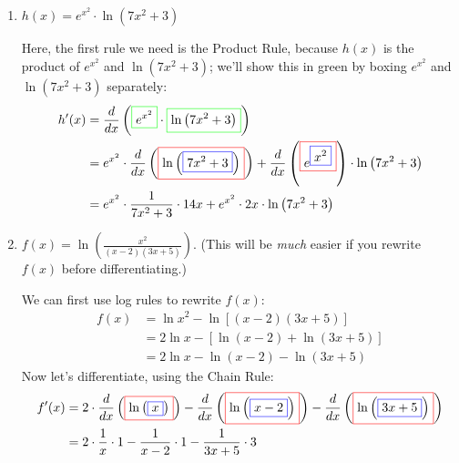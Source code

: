 \documentclass{article}
\begin{document}
\begin{enumerate}
\begin{enumerate}
  \item
    \begin{problem}[\vfill]
      $h(x) = e^{x^2} \cdot \ln (7x^2 + 3)$
    \end{problem}

    \begin{solution}
      Here, the first rule we need is the Product Rule, because $h(x)$ is
      the product of $e^{x^2}$ and $\ln(7x^2 + 3)$; we'll show this in
      green by boxing $e^{x^2}$ and $\ln(7x^2 + 3)$ separately:
      \begin{align*}
        h'(x) = {} & \frac{d}{dx} \left(\fcolorbox{green}{white}{$\displaystyle  e^ { x^ { 2} } $}\cdot \fcolorbox{green}{white}{$\displaystyle  \ln\left(7 x^ { 2} + 3\right)$}\right) \\
        = {} & e^ { x^ { 2} } \cdot \frac{d}{dx} \left(\fcolorbox{red}{white}{$\displaystyle \ln\left(\fcolorbox{blue}{white}{$\displaystyle 7 x^ { 2} + 3$}\right)$}\right)+ \frac{d}{dx} \left(\fcolorbox{red}{white}{$\displaystyle e^ { \fcolorbox{blue}{white}{$\displaystyle x^ { 2} $}} $}\right)\cdot \ln\left(7 x^ { 2} + 3\right) \\
        = {} & e^ { x^ { 2} } \cdot \frac{1}{7 x^ { 2} + 3}\cdot 14 x+ e^
        { x^ { 2} } \cdot 2 x \cdot \ln\left(7 x^ { 2} + 3\right)
      \end{align*}
    \end{solution}

  \item

    \begin{problem}[\vfill\newpage]
      $\displaystyle f(x) = \ln\left( \frac{x^2}{(x-2)(3x+5)}
      \right)$.  (This will be \textit{much} easier if you rewrite $f(x)$
      {before} differentiating.)
    \end{problem}

    \begin{solution}
      We can first use log rules to rewrite $f(x)$:
      \begin{align*}
        f(x) &= \ln x^2 - \ln [(x - 2) (3x + 5)] \\
        &= 2 \ln x - \left[ \ln(x - 2) + \ln (3x + 5)
        \right] \\
        &= 2 \ln x - \ln(x - 2) - \ln (3x + 5)
      \end{align*}
      Now let's differentiate, using the Chain Rule:
      \begin{align*}
        f'(x) = {} & 2 \cdot \frac{d}{dx} \left(\fcolorbox{red}{white}{$\displaystyle \ln\left(\fcolorbox{blue}{white}{$\displaystyle x$}\right)$}\right)-\frac{d}{dx} \left(\fcolorbox{red}{white}{$\displaystyle \ln\left(\fcolorbox{blue}{white}{$\displaystyle x-2$}\right)$}\right)-\frac{d}{dx} \left(\fcolorbox{red}{white}{$\displaystyle \ln\left(\fcolorbox{blue}{white}{$\displaystyle 3x+ 5$}\right)$}\right) \\
        = {} & 2\cdot \frac{1}{x}\cdot 1-\frac{1}{x-2}\cdot 1-\frac{1}{3x+ 5}\cdot 3
      \end{align*}
    \end{solution}


\end{enumerate}
\end{enumerate}
\end{document}
